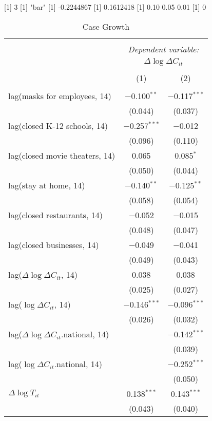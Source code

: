[1] 3
[1] "bar"
[1] -0.2244867
[1] 0.1612418
[1] 0.10 0.05 0.01
[1] 0

\begin{table}[!htbp] \centering 
  \caption{Case Growth} 
  \label{} 
\begin{tabular}{@{\extracolsep{1pt}}lcc} 
\\[-1.8ex]\hline 
\hline \\[-1.8ex] 
 & \multicolumn{2}{c}{\textit{Dependent variable:}} \\ 
\cline{2-3} 
 & \multicolumn{2}{c}{$\Delta \log \Delta C_{it}$} \\ 
\\[-1.8ex] & (1) & (2)\\ 
\hline \\[-1.8ex] 
 lag(masks for employees, 14) & $-$0.100$^{**}$ & $-$0.117$^{***}$ \\ 
  & (0.044) & (0.037) \\ 
  lag(closed K-12 schools, 14) & $-$0.257$^{***}$ & $-$0.012 \\ 
  & (0.096) & (0.110) \\ 
  lag(closed movie theaters, 14) & 0.065 & 0.085$^{*}$ \\ 
  & (0.050) & (0.044) \\ 
  lag(stay at home, 14) & $-$0.140$^{**}$ & $-$0.125$^{**}$ \\ 
  & (0.058) & (0.054) \\ 
  lag(closed restaurants, 14) & $-$0.052 & $-$0.015 \\ 
  & (0.048) & (0.047) \\ 
  lag(closed businesses, 14) & $-$0.049 & $-$0.041 \\ 
  & (0.049) & (0.043) \\ 
  lag($\Delta \log \Delta C_{it}$, 14) & 0.038 & 0.038 \\ 
  & (0.025) & (0.027) \\ 
  lag($\log \Delta C_{it}$, 14) & $-$0.146$^{***}$ & $-$0.096$^{***}$ \\ 
  & (0.026) & (0.032) \\ 
  lag($\Delta \log \Delta C_{it}$.national, 14) &  & $-$0.142$^{***}$ \\ 
  &  & (0.039) \\ 
  lag($\log \Delta C_{it}$.national, 14) &  & $-$0.252$^{***}$ \\ 
  &  & (0.050) \\ 
  $\Delta \log T_{it}$ & 0.138$^{***}$ & 0.143$^{***}$ \\ 
  & (0.043) & (0.040) \\ 

\end{tabular}
\end{table}
